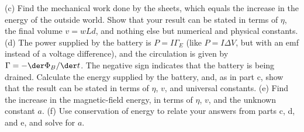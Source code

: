         (c) Find the mechanical work done by the sheets,
        which equals the increase in the energy of the outside world. Show that your
        result can be stated in terms of $\eta$, the final volume $v=wLd$, and nothing
        else but numerical and physical constants.\answercheck\hwendpart
        (d) The power supplied by the battery is $P=I\Gamma_E$ (like $P=I\Delta V$, but
        with an emf instead of a voltage difference), and the circulation is given
        by $\Gamma=-\der\Phi_B/\der t$. The negative sign indicates that the battery is
        being drained. Calculate the energy supplied by the battery, and, as in part c,
        show that the result can be stated in terms of $\eta$, $v$, and 
        universal constants.\answercheck\hwendpart
        (e) Find the increase in the magnetic-field energy, in terms of
        $\eta$, $v$, and the unknown constant $a$.\answercheck\hwendpart
        (f) Use conservation of energy to relate your answers from parts c, d, and e,
        and solve for $a$.\answercheck        
